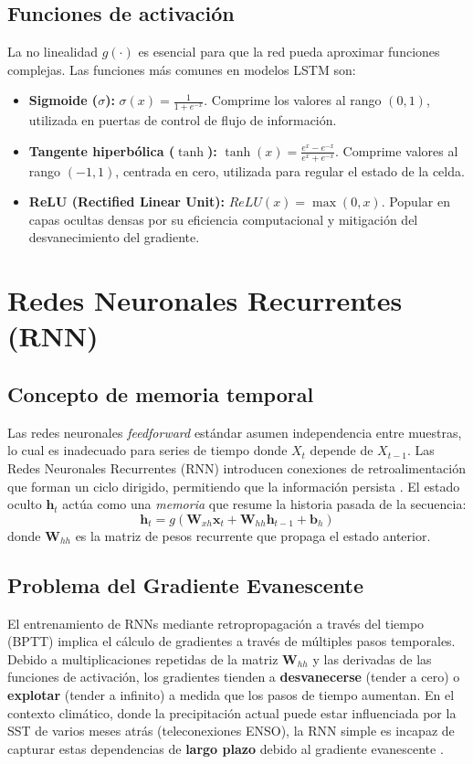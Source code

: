 \subsection{Funciones de activación}
La no linealidad \(g(\cdot)\) es esencial para que la red pueda aproximar funciones complejas. Las funciones más comunes en modelos LSTM son:
\begin{itemize}
    \item \textbf{Sigmoide (\(\sigma\)):} \(\sigma(x) = \frac{1}{1+e^{-x}}\). Comprime los valores al rango \((0, 1)\), utilizada en puertas de control de flujo de información.
    \item \textbf{Tangente hiperbólica (\(\tanh\)):} \(\tanh(x) = \frac{e^x - e^{-x}}{e^x + e^{-x}}\). Comprime valores al rango \((-1, 1)\), centrada en cero, utilizada para regular el estado de la celda.
    \item \textbf{ReLU (Rectified Linear Unit):} \(ReLU(x) = \max(0, x)\). Popular en capas ocultas densas por su eficiencia computacional y mitigación del desvanecimiento del gradiente.
\end{itemize}

\section{Redes Neuronales Recurrentes (RNN)}

\subsection{Concepto de memoria temporal}
Las redes neuronales \textit{feedforward} estándar asumen independencia entre muestras, lo cual es inadecuado para series de tiempo donde \(X_t\) depende de \(X_{t-1}\). Las Redes Neuronales Recurrentes (RNN) introducen conexiones de retroalimentación que forman un ciclo dirigido, permitiendo que la información persista \citep{medsker2001recurrent}. El estado oculto \(\mathbf{h}_t\) actúa como una \textit{memoria} que resume la historia pasada de la secuencia:
\begin{equation}
    \mathbf{h}_t = g(\mathbf{W}_{xh} \mathbf{x}_t + \mathbf{W}_{hh} \mathbf{h}_{t-1} + \mathbf{b}_h)
\end{equation}
donde \(\mathbf{W}_{hh}\) es la matriz de pesos recurrente que propaga el estado anterior.

\subsection{Problema del Gradiente Evanescente}
El entrenamiento de RNNs mediante retropropagación a través del tiempo (BPTT) implica el cálculo de gradientes a través de múltiples pasos temporales. Debido a multiplicaciones repetidas de la matriz \(\mathbf{W}_{hh}\) y las derivadas de las funciones de activación, los gradientes tienden a \textbf{desvanecerse} (tender a cero) o \textbf{explotar} (tender a infinito) a medida que los pasos de tiempo aumentan. En el contexto climático, donde la precipitación actual puede estar influenciada por la SST de varios meses atrás (teleconexiones ENSO), la RNN simple es incapaz de capturar estas dependencias de \textbf{largo plazo} debido al gradiente evanescente \citep{VanishingGradient}.

